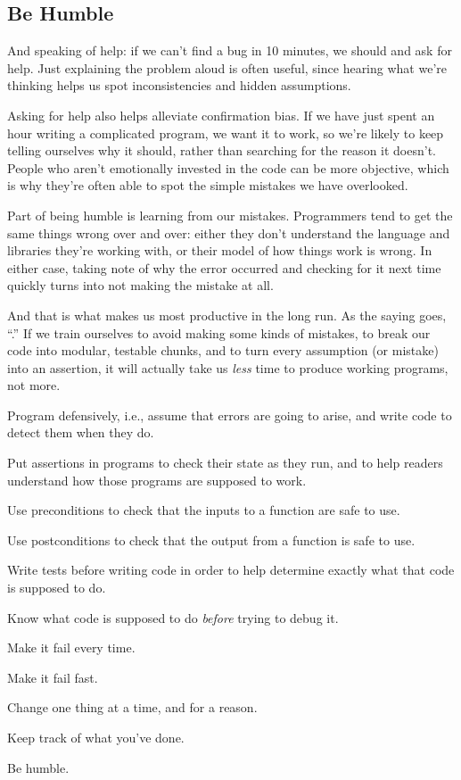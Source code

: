 \subsection*{Be Humble}

And speaking of help: if we can't find a bug in 10 minutes, we should
 and ask for help. Just
explaining the problem aloud is often useful, since hearing what we're
thinking helps us spot inconsistencies and hidden assumptions.

Asking for help also helps alleviate confirmation bias. If we have just
spent an hour writing a complicated program, we want it to work, so
we're likely to keep telling ourselves why it should, rather than
searching for the reason it doesn't. People who aren't emotionally
invested in the code can be more objective, which is why they're often
able to spot the simple mistakes we have overlooked.

Part of being humble is learning from our mistakes. Programmers tend to
get the same things wrong over and over: either they don't understand
the language and libraries they're working with, or their model of how
things work is wrong. In either case, taking note of why the error
occurred and checking for it next time quickly turns into not making the
mistake at all.

And that is what makes us most productive in the long run. As the saying
goes, ``.'' If we train
ourselves to avoid making some kinds of mistakes, to break our code into
modular, testable chunks, and to turn every assumption (or mistake) into
an assertion, it will actually take us \emph{less} time to produce
working programs, not more.

\begin{keypoints}
\begin{swcitemize}
\item
  Program defensively, i.e., assume that errors are going to arise, and
  write code to detect them when they do.
\item
  Put assertions in programs to check their state as they run, and to
  help readers understand how those programs are supposed to work.
\item
  Use preconditions to check that the inputs to a function are safe to
  use.
\item
  Use postconditions to check that the output from a function is safe to
  use.
\item
  Write tests before writing code in order to help determine exactly
  what that code is supposed to do.
\item
  Know what code is supposed to do \emph{before} trying to debug it.
\item
  Make it fail every time.
\item
  Make it fail fast.
\item
  Change one thing at a time, and for a reason.
\item
  Keep track of what you've done.
\item
  Be humble.
\end{swcitemize}
\end{keypoints}

